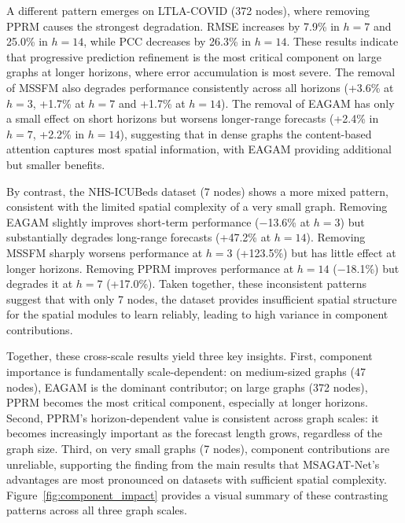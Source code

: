 \documentclass[final,1p,times]{elsarticle}
\begin{document}
A different pattern emerges on LTLA-COVID (372 nodes), where removing PPRM causes the strongest degradation. RMSE increases by 7.9\% in $h{=}7$ and 25.0\% in $h{=}14$, while PCC decreases by 26.3\% in $h{=}14$. These results indicate that progressive prediction refinement is the most critical component on large graphs at longer horizons, where error accumulation is most severe. The removal of MSSFM also degrades performance consistently across all horizons (+3.6\% at $h{=}3$, +1.7\% at $h{=}7$ and +1.7\% at $h{=}14$). The removal of EAGAM has only a small effect on short horizons but worsens longer-range forecasts (+2.4\% in $h{=}7$, +2.2\% in $h{=}14$), suggesting that in dense graphs the content-based attention captures most spatial information, with EAGAM providing additional but smaller benefits.

By contrast, the NHS-ICUBeds dataset (7 nodes) shows a more mixed pattern, consistent with the limited spatial complexity of a very small graph. Removing EAGAM slightly improves short-term performance ($-$13.6\% at $h{=}3$) but substantially degrades long-range forecasts (+47.2\% at $h{=}14$). Removing MSSFM sharply worsens performance at $h{=}3$ (+123.5\%) but has little effect at longer horizons. Removing PPRM improves performance at $h{=}14$ ($-$18.1\%) but degrades it at $h{=}7$ (+17.0\%). Taken together, these inconsistent patterns suggest that with only 7 nodes, the dataset provides insufficient spatial structure for the spatial modules to learn reliably, leading to high variance in component contributions.

Together, these cross-scale results yield three key insights. First, component importance is fundamentally scale-dependent: on medium-sized graphs (47 nodes), EAGAM is the dominant contributor; on large graphs (372 nodes), PPRM becomes the most critical component, especially at longer horizons. Second, PPRM's horizon-dependent value is consistent across graph scales: it becomes increasingly important as the forecast length grows, regardless of the graph size. Third, on very small graphs (7 nodes), component contributions are unreliable, supporting the finding from the main results that MSAGAT-Net's advantages are most pronounced on datasets with sufficient spatial complexity. Figure~\ref{fig:component_impact} provides a visual summary of these contrasting patterns across all three graph scales.
\end{document}
